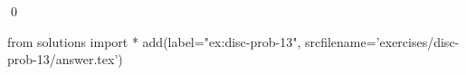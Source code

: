 
\begin{ex} 
  \label{ex:disc-prob-13}
  
  \qed
\end{ex} 
\begin{python0}
from solutions import *
add(label="ex:disc-prob-13",
    srcfilename='exercises/disc-prob-13/answer.tex') 
\end{python0}
